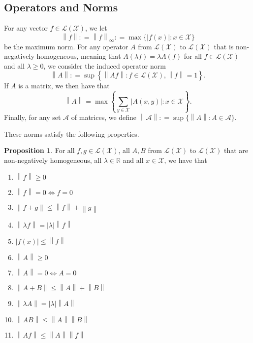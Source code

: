 \documentclass[10pt]{paper}
\theoremstyle{definition}
\newtheorem{proposition}[theorem]{Proposition}
\newcommand{\reals}{\mathbb{R}}
\newcommand{\states}{\mathcal{X}}
\newcommand{\gambles}{\mathcal{L}}
\newcommand{\gamblesX}{\gambles(\states)}
\newcommand{\asa}{\Leftrightarrow}
\newcommand{\norm}[1]{\left\lVert #1 \right\rVert}
\newcommand{\abs}[1]{\left\vert #1 \right\vert}
\newcommand{\coloneqq}{:\!=}
\begin{document}
\subsection{Operators and Norms}\label{sec:func_oper_norm}
For any vector $f\in\gamblesX$, we let
\begin{equation*}
\norm{f}\coloneqq\norm{f}_{\infty}\coloneqq\max\{\abs {f(x)}\colon x\in\states\}
\end{equation*}
be the maximum norm. For any operator $A$ from $\gamblesX$ to $\gamblesX$ that is non-negatively homogeneous, meaning that $A(\lambda f)=\lambda A(f)$ for all $f\in\gamblesX$ and all $\lambda\geq0$, we consider the induced operator norm
\begin{equation*}
\norm{A}\coloneqq\sup\left\{\norm{Af}\colon f\in\gamblesX,\norm{f}=1\right\}.
\end{equation*}
If $A$ is a matrix, we then have that
\begin{equation*}
\norm{A}
=
\max\left\{\sum_{y\in\states}\abs{A(x,y)}\colon x\in\states\right\}.
\end{equation*}
\noindent
Finally, for any set $\mathcal{A}$ of matrices, we define $\norm{\mathcal{A}}\coloneqq\sup\{\norm{A}\colon A\in\mathcal{A}\}$.


\noindent These norms satisfy the following properties. 

\begin{proposition}\label{prop:norm_properties}
For all $f,g\in\gamblesX$, all $A,B$ from $\gamblesX$ to $\gamblesX$ that are non-negatively homogeneous, all $\lambda\in\reals$ and all $x\in\states$, we have that
\vspace{5pt}

\begin{multicols}{2}
\begin{enumerate}[label=N\arabic*:,ref=N\arabic*]
\item
$\norm{f}\geq0$
\item
$\norm{f}=0\asa f=0$
\item
$\norm{f+g}\leq\norm{f}+\norm{g}$
\item
$\norm{\lambda f}=\abs{\lambda}\norm{f}$
\item
$\abs{f(x)}\leq\norm{f}$ \\
\item
$\norm{A}\geq0$
\item
$\norm{A}=0\asa A=0$
\item
$\norm{A+B}\leq\norm{A}+\norm{B}$
\item\label{N:homogeneous}
$\norm{\lambda A}=\abs{\lambda}\norm{A}$
\item\label{N:normAB}
$\norm{AB}\leq\norm{A}\norm{B}$
\item\label{N:normAf}
$\norm{Af}\leq\norm{A}\norm{f}$
\end{enumerate}
\end{multicols}
\end{proposition}
\end{document}

